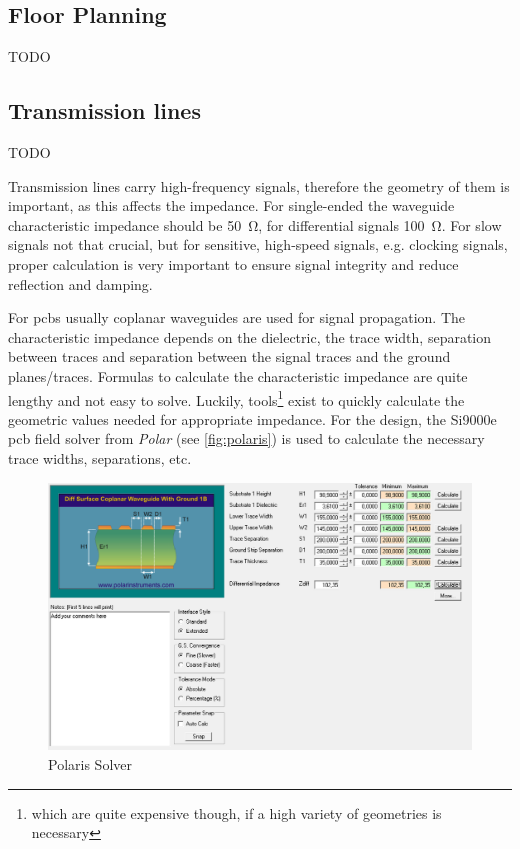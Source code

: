 \subsection{Floor Planning}
TODO
\subsection{Transmission lines}
TODO 

Transmission lines carry high-frequency signals, therefore the geometry of them is important, as this affects the impedance.
For single-ended the waveguide characteristic impedance should be \SI{50}{\ohm}, for differential signals \SI{100}{\ohm}.
For slow signals not that crucial, but for sensitive, high-speed signals, e.g. clocking signals, proper calculation is very important to ensure signal integrity and reduce reflection and damping. 

For \glspl{pcb} usually coplanar waveguides are used for signal propagation.
The characteristic impedance depends on the dielectric, the trace width, separation between traces and separation between the signal traces and the ground planes/traces.
Formulas to calculate the characteristic impedance are quite lengthy and not easy to solve.
Luckily, tools\footnote{which are quite expensive though, if a high variety of geometries is necessary} exist to quickly calculate the geometric values needed for appropriate impedance. %
For the design, the Si9000e \gls{pcb} field solver from \textit{Polar} (see \autoref{fig:polaris}) is used to calculate the necessary trace widths, separations, etc.

\begin{figure}[tbh]
	\centering
	\includegraphics[width = \textwidth]{chap/04-work/img/polaris}
	\caption{Polaris Solver} %
	\label{fig:polaris}
\end{figure}

